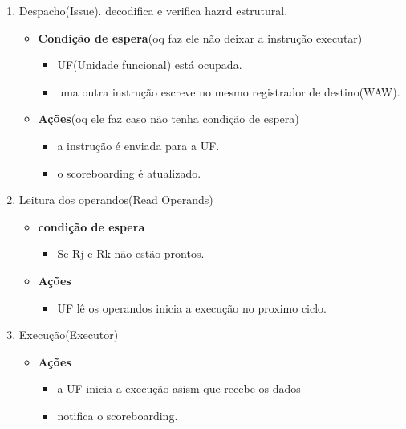 \documentclass[a4paper]{article}
\begin{document}
\begin{enumerate}
    \item Despacho(Issue). decodifica e verifica hazrd estrutural.
    \begin{itemize}
        \item \textbf{Condição de espera}(oq faz ele não deixar a instrução executar)
            \begin{itemize}
                \item UF(Unidade funcional) está  ocupada.
                \item uma outra instrução escreve no mesmo registrador de destino(WAW).
            \end{itemize}
        \item \textbf{Ações}(oq ele faz caso não tenha condição de espera)
            \begin{itemize}
                \item a instrução é enviada para a UF.
                \item o scoreboarding é  atualizado.
            \end{itemize}
    \end{itemize}
    \item Leitura dos operandos(Read Operands)
        \begin{itemize}
            \item \textbf{condição de espera}
                \begin{itemize}
                    \item Se Rj e Rk não estão prontos.
                \end{itemize}
            \item \textbf{Ações}
                \begin{itemize}
                    \item UF lê os operandos inicia a execução no proximo ciclo.
                \end{itemize}
        \end{itemize}
    \item Execução(Executor)
        \begin{itemize}
            \item \textbf{Ações}
                \begin{itemize}
                    \item a UF inicia a execução asism que recebe os dados
                    \item notifica o scoreboarding.
                \end{itemize}

\end{itemize}
\end{enumerate}
\end{document}
